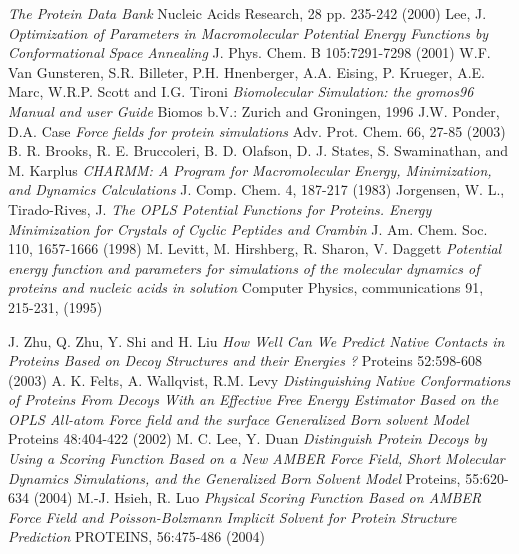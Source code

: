 \documentclass[a4paper,20pt,notitlepage,openbib]{article}
\begin{document}
\begin{thebibliography}{99}
\emph{The Protein Data Bank}
Nucleic Acids Research, 28 pp. 235-242 (2000)
Lee, J.
\emph{Optimization of Parameters in Macromolecular Potential Energy Functions by Conformational Space Annealing}
J. Phys. Chem. B 105:7291-7298 (2001)
W.F. Van Gunsteren, S.R. Billeter, P.H. Hnenberger, A.A. Eising, P. Krueger, A.E. Marc, W.R.P. Scott and I.G. Tironi
\emph{Biomolecular Simulation: the gromos96 Manual and user Guide}
Biomos b.V.: Zurich and Groningen, 1996
J.W. Ponder, D.A. Case
\emph{Force fields for protein simulations}
Adv. Prot. Chem. 66, 27-85 (2003)
B. R. Brooks, R. E. Bruccoleri, B. D. Olafson, D. J. States, S. Swaminathan, and M. Karplus
\emph{CHARMM: A Program for Macromolecular Energy, Minimization, and Dynamics Calculations}
J. Comp. Chem. 4, 187-217 (1983)
Jorgensen, W. L., Tirado-Rives, J.
\emph{The OPLS Potential Functions for Proteins. Energy Minimization for Crystals of Cyclic Peptides and Crambin}
J. Am. Chem. Soc. 110, 1657-1666 (1998)
M. Levitt, M. Hirshberg, R. Sharon, V. Daggett
\emph{Potential energy function and parameters for simulations of the molecular dynamics of proteins and nucleic acids in solution}
Computer Physics, communications 91, 215-231, (1995)

J. Zhu, Q. Zhu, Y. Shi and H. Liu
\emph{How Well Can We Predict Native Contacts in Proteins Based on Decoy Structures and their Energies ?}
Proteins 52:598-608 (2003)
A. K. Felts, A. Wallqvist, R.M. Levy
\emph{Distinguishing Native Conformations of Proteins From Decoys With an Effective Free Energy Estimator Based on the OPLS All-atom Force field and the surface Generalized Born solvent Model}
Proteins 48:404-422 (2002)
M. C. Lee, Y. Duan
\emph{Distinguish Protein Decoys by Using a Scoring Function Based on a New AMBER Force Field, Short Molecular Dynamics Simulations, and the Generalized Born Solvent Model}
Proteins, 55:620-634 (2004)
M.-J. Hsieh, R. Luo
\emph{Physical Scoring Function Based on AMBER Force Field and Poisson-Bolzmann Implicit Solvent for Protein Structure Prediction}
PROTEINS, 56:475-486 (2004)




\end{thebibliography}
\end{document}
